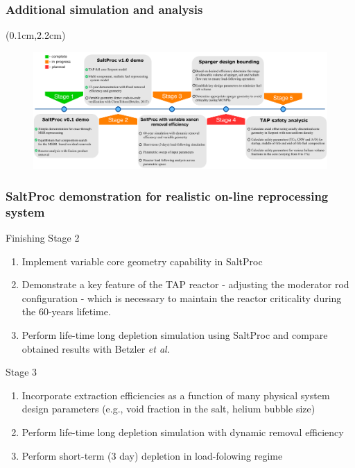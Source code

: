 \begin{frame}
\frametitle{Additional simulation and analysis}       
\begin{textblock*}{12.5cm}(0.1cm,2.2cm) %
	\begin{figure}[ht!] %
		\includegraphics[width=\textwidth]{./images/progress_chart.pdf} 
	\end{figure}
\end{textblock*}
\end{frame}


\begin{frame}
\frametitle{SaltProc demonstration for realistic on-line reprocessing system}
	\begin{block}{Finishing Stage 2}
		\begin{enumerate}
			\item Implement variable core geometry capability in SaltProc
			\item Demonstrate a key feature of
the \gls{TAP} reactor - 
			adjusting the moderator rod configuration - which is necessary to 
			maintain
the reactor criticality during the 60-years lifetime.
			\item Perform life-time long depletion simulation using SaltProc 
			and compare obtained results with Betzler \emph{et al.} 
			\cite{betzler_assessment_2017}
		\end{enumerate}
	\end{block}
	
	\begin{block}{Stage 3}
		\begin{enumerate}
			\item Incorporate extraction efficiencies as a function of many 
			physical system design
parameters (e.g., void fraction in the 
			salt, helium bubble size)
			\item Perform life-time long depletion simulation with dynamic 
			removal efficiency
			\item Perform short-term (3 day) depletion in load-folowing regime
		\end{enumerate}
	\end{block}
\end{frame}

